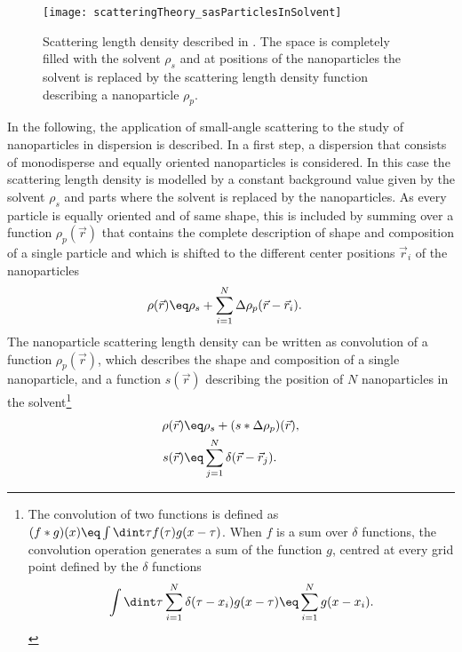 \documentclass[\main/dresen_thesis.tex]{subfiles}
\begin{document}
\begin{figure}[tb]
  \centering
  \texttt{[image: scatteringTheory\_sasParticlesInSolvent]}
  \caption{\label{fig:theoreticalBackground:scattering:scatteringTheory:sasParticlesInSolvent}Scattering length density described in . The space is completely filled with the solvent $\rho_s$ and at positions of the nanoparticles the solvent is replaced by the scattering length density function describing a nanoparticle $\rho_p$.}
\end{figure}
In the following, the application of small-angle scattering to the study of nanoparticles in dispersion is described.
In a first step, a dispersion that consists of monodisperse and equally oriented nanoparticles is considered.
In this case the scattering length density is modelled by a constant background value given by the solvent $\rho_s$ and parts where the solvent is replaced by the nanoparticles.
As every particle is equally oriented and of same shape, this is included by summing over a function $\rho_p (\vec{r})$ that contains the complete description of shape and composition of a single particle and which is shifted to the different center positions $\vec{r}_i$ of the nanoparticles
\begin{align}
  \rho(\vec{r}) \eq& \rho_s + \sum_{i=1}^N \Delta \rho_{p}(\vec{r} - \vec{r}_i).\label{eq:theoreticalBackground:scattering:scatteringTheory:sasParticlesInSolvent}
\end{align}
The nanoparticle scattering length density can be written as convolution of a function $\rho_{p}(\vec{r})$, which describes the shape and composition of a single nanoparticle, and a function $s(\vec{r})$ describing the position of $N$ nanoparticles in the solvent\footnote{The convolution of two functions is defined as $(f*g)(x) \eq \int \dint \tau f(\tau) g(x-\tau)$.
 When $f$ is a sum over $\delta$ functions, the convolution operation generates a sum of the function $g$, centred at every grid point defined by the $\delta$ functions
\begin{equation}
  \int \dint \tau \sum_{i=1}^N \delta(\tau - x_i) g(x-\tau) \eq \sum_{i=1}^N g(x - x_i).
\end{equation}}
\begin{align}
  \rho(\vec{r}) \eq& \rho_s + (s * \Delta \rho_{p})(\vec{r}),\\
  s(\vec{r}) \eq& \sum_{j=1}^N \delta(\vec{r} - \vec{r}_j).
\end{align}
\end{document}
